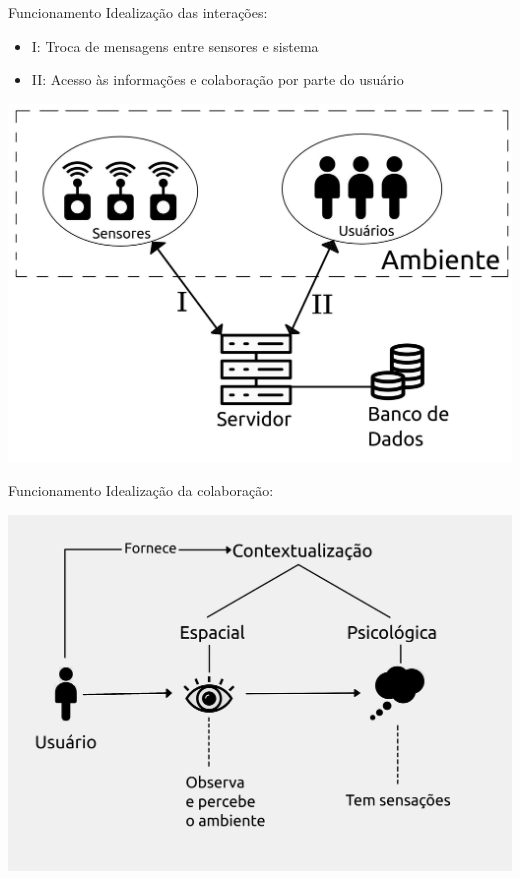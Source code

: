 \documentclass{beamer}
\begin{document}
  \begin{frame}{Funcionamento}
    \quad Idealização das interações:
    \begin{itemize}
      \item I: Troca de mensagens entre sensores e sistema
      \item II: Acesso às informações e colaboração por parte do usuário
    \end{itemize}\vspace{-5mm}
    \begin{center}
    \includegraphics[scale=0.1]{solucao1}
    \end{center}
  \end{frame}
  \begin{frame}{Funcionamento}
    \quad Idealização da colaboração:
    \begin{center}
    \includegraphics[scale=0.7]{solucao2}
    \end{center}
  \end{frame}
\end{document}
